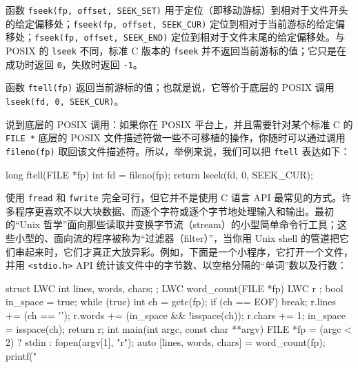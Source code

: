 函数 \texttt{fseek(\allowbreak{}fp,\allowbreak{} offset,\allowbreak{} SEEK\_\allowbreak{}SET)\allowbreak{}} 用于定位（即移动游标）到相对于文件开头的给定偏移处；\texttt{fseek(\allowbreak{}fp,\allowbreak{} offset,\allowbreak{} SEEK\_\allowbreak{}CUR)\allowbreak{}} 定位到相对于当前游标的给定偏移处；\texttt{fseek(\allowbreak{}fp,\allowbreak{} offset,\allowbreak{} SEEK\_\allowbreak{}END)\allowbreak{}} 定位到相对于文件末尾的给定偏移处。与 POSIX 的 \texttt{lseek} 不同，标准 C 版本的 \texttt{fseek} 并不返回当前游标的值；它只是在成功时返回 \texttt{0}，失败时返回 \texttt{-1}。

函数 \texttt{ftell(\allowbreak{}fp)\allowbreak{}} 返回当前游标的值；也就是说，它等价于底层的 POSIX 调用 \texttt{lseek(\allowbreak{}fd,\allowbreak{} 0,\allowbreak{} SEEK\_\allowbreak{}CUR)\allowbreak{}}。

说到底层的 POSIX 调用：如果你在 POSIX 平台上，并且需要针对某个标准 C 的 \texttt{FILE *} 底层的 POSIX 文件描述符做一些不可移植的操作，你随时可以通过调用 \texttt{fileno(\allowbreak{}fp)\allowbreak{}} 取回该文件描述符。所以，举例来说，我们可以把 \texttt{ftell} 表达如下：

\begin{codebox}[cpp]
    long ftell(FILE *fp)
    {
      int fd = fileno(fp);
      return lseek(fd, 0, SEEK_CUR);
    }
\end{codebox}

使用 \texttt{fread} 和 \texttt{fwrite} 完全可行，但它并不是使用 C 语言 API 最常见的方式。许多程序更喜欢不以大块数据、而逐个字符或逐个字节地处理输入和输出。最初的“Unix 哲学”面向那些读取并变换字节流（stream）的小型简单命令行工具；这些小型的、面向流的程序被称为“过滤器（filter）”，当你用 Unix shell 的管道把它们串起来时，它们才真正大放异彩。例如，下面是一个小程序，它打开一个文件，并用 \texttt{<stdio.\allowbreak{}h>\allowbreak{}} API 统计该文件中的字节数、以空格分隔的“单词”数以及行数：

\begin{codebox}[cpp]
    struct LWC {
      int lines, words, chars;
    };
    LWC word_count(FILE *fp)
    {
      LWC r {};
      bool in_space = true;
      while (true) {
        int ch = getc(fp);
        if (ch == EOF) break;
        r.lines += (ch == '\n');
        r.words += (in_space && !isspace(ch));
        r.chars += 1;
        in_space = isspace(ch);
      }
      return r;
    }
    int main(int argc, const char **argv)
    {
      FILE *fp = (argc < 2) ? stdin : fopen(argv[1], "r");
      auto [lines, words, chars] = word_count(fp);
      printf("%
    }
\end{codebox}

